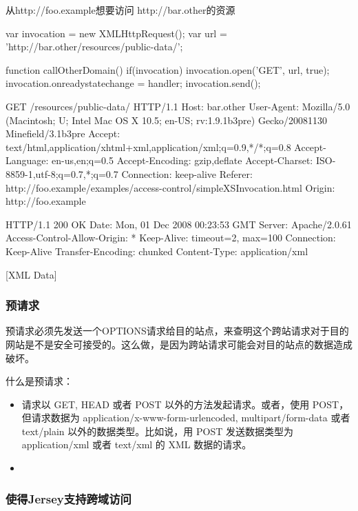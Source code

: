 从http://foo.example想要访问 http://bar.other的资源

\begin{JavaScript}
var invocation = new XMLHttpRequest();
var url = 'http://bar.other/resources/public-data/';
   
function callOtherDomain() {
  if(invocation) {    
    invocation.open('GET', url, true);
    invocation.onreadystatechange = handler;
    invocation.send(); 
  }
}
\end{JavaScript}

\begin{HTML5}
GET /resources/public-data/ HTTP/1.1
Host: bar.other
User-Agent: Mozilla/5.0 (Macintosh; U; Intel Mac OS X 10.5; en-US; rv:1.9.1b3pre) Gecko/20081130 Minefield/3.1b3pre
Accept: text/html,application/xhtml+xml,application/xml;q=0.9,*/*;q=0.8
Accept-Language: en-us,en;q=0.5
Accept-Encoding: gzip,deflate
Accept-Charset: ISO-8859-1,utf-8;q=0.7,*;q=0.7
Connection: keep-alive
Referer: http://foo.example/examples/access-control/simpleXSInvocation.html
Origin: http://foo.example


HTTP/1.1 200 OK
Date: Mon, 01 Dec 2008 00:23:53 GMT
Server: Apache/2.0.61 
Access-Control-Allow-Origin: *
Keep-Alive: timeout=2, max=100
Connection: Keep-Alive
Transfer-Encoding: chunked
Content-Type: application/xml

[XML Data]
\end{HTML5}


\subsubsection{预请求}

预请求必须先发送一个OPTIONS请求给目的站点，来查明这个跨站请求对于目的网站是不是安全可接受的。这么做，是因为跨站请求可能会对目的站点的数据造成破坏。

什么是预请求：
\begin{itemize}
\item 请求以 GET, HEAD 或者 POST 以外的方法发起请求。或者，使用 POST，但请求数据为 application/x-www-form-urlencoded, multipart/form-data 或者 text/plain 以外的数据类型。比如说，用 POST 发送数据类型为 application/xml 或者 text/xml 的 XML 数据的请求。
\item
\end{itemize}


\subsubsection{使得Jersey支持跨域访问}

